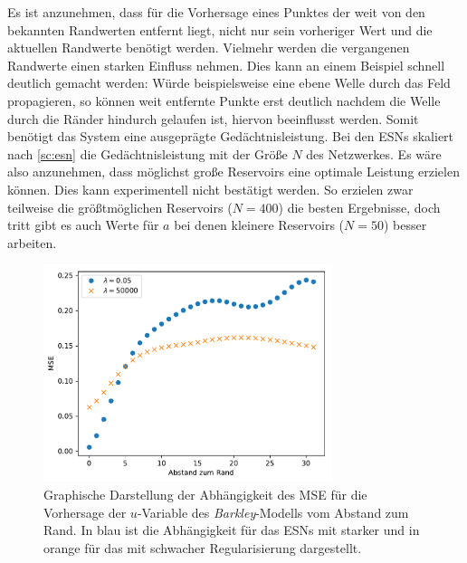 Es ist anzunehmen, dass für die Vorhersage eines Punktes der weit von den bekannten Randwerten entfernt liegt, nicht nur sein vorheriger Wert und die aktuellen Randwerte benötigt werden. Vielmehr werden die vergangenen Randwerte einen starken Einfluss nehmen. Dies kann an einem Beispiel schnell deutlich gemacht werden: Würde beispielsweise eine ebene Welle durch das Feld propagieren, so können weit entfernte Punkte erst deutlich nachdem die Welle durch die Ränder hindurch gelaufen ist, hiervon beeinflusst werden. Somit benötigt das System eine ausgeprägte Gedächtnisleistung. Bei den \textsc{ESN}s skaliert nach \ref{sc:esn} die Gedächtnisleistung mit der Größe $N$ des Netzwerkes. Es wäre also anzunehmen, dass möglichst große Reservoirs eine optimale Leistung erzielen können. Dies kann experimentell nicht bestätigt werden. So erzielen zwar teilweise die größtmöglichen Reservoirs ($N=400$) die besten Ergebnisse, doch tritt gibt es auch Werte für $a$ bei denen kleinere Reservoirs ($N=50$) besser arbeiten.\\

\begin{figure}[h]
	\centering
	\includegraphics[height=2.5in]{figures/results/inner_cross_prediction/inner_errors.pdf}
	\setcapmargin[1cm]{0.5cm}
	\caption{Graphische Darstellung der Abhängigkeit des MSE für die Vorhersage der $u$-Variable des \textit{Barkley}-Modells vom Abstand zum Rand. In blau ist die Abhängigkeit für das \textsc{ESN}s mit starker und in orange für das mit schwacher Regularisierung dargestellt.}
	\label{fig:exp_inner_cross_barkley_esn_error_dependency_comparison}
\end{figure} 

